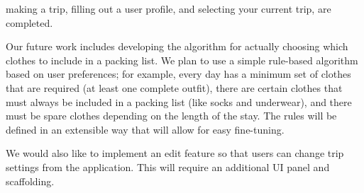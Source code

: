 \documentclass[11pt]{article}
\begin{document}
making a trip, filling out a user profile, and selecting your current trip, are completed. 

Our future work includes developing the algorithm for actually choosing which clothes to include in a packing list. We plan to use a simple rule-based algorithm based on user preferences; for example, every day has a minimum set of clothes that are required (at least one complete outfit), there are certain clothes that must always be included in a packing list (like socks and underwear), and there must be spare clothes depending on the length of the stay. The rules will be defined in an extensible way that will allow for easy fine-tuning.

We would also like to implement an edit feature so that users can change trip settings from the application. This will require an additional UI panel and scaffolding.
\end{document}
